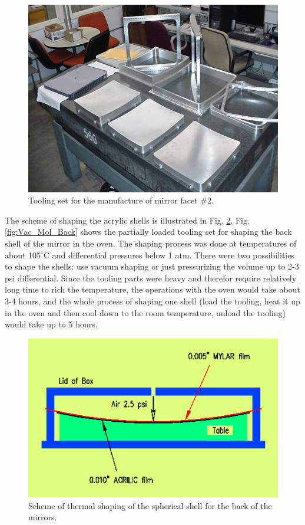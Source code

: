\begin{figure}[ht]
    \centering
    \includegraphics[width=1.0\linewidth]{images/Tool_on_tbl.jpg}
    \caption{Tooling set for the manufacture of mirror facet \#2.}
    \label{fig:Tool_on_tbl}
\end{figure}

The scheme of shaping the acrylic shells is illustrated in  Fig. \ref{fig:Shaping_new}. Fig. \ref{fig:Vac_Mol_Back} shows the partially loaded tooling set for shaping the back shell of the mirror in the oven. The shaping process was done at temperatures of about 105$^\circ$C and differential pressures below 1 atm. There were two possibilities to shape the shells: use vacuum shaping or just pressurizing the volume up to 2-3 psi differential. Since the tooling parts were heavy and therefor require relatively long time to rich the temperature, the operations with the oven would take about 3-4 hours, and the whole process of shaping one shell (load the tooling, heat it up in the oven and then cool down to the room temperature, unload the tooling) would take up to 5 hours.

\begin{figure}[ht]
    \centering
    \includegraphics[width=1.0\linewidth]{images/Shaping_new.png}
    \caption{Scheme of thermal shaping of the spherical shell for the back of the mirrors.}
    \label{fig:Shaping_new}
\end{figure}

